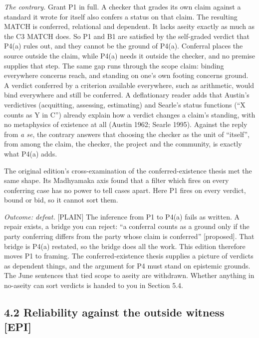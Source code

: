 \documentclass[11pt]{article}
\newcommand{\register}[1]{{\ttfamily\small #1}}
\begin{document}
\emph{The contrary.} Grant P1 in full. A checker that grades its own claim against a standard it wrote for itself also confers a status on that claim. The resulting MATCH is conferred, relational and dependent. It lacks aseity exactly as much as the C3 MATCH does. So P1 and B1 are satisfied by the self-graded verdict that P4(a) rules out, and they cannot be the ground of P4(a). Conferral places the source outside the claim, while P4(a) needs it outside the checker, and no premise supplies that step. The same gap runs through the scope claim: binding everywhere concerns reach, and standing on one's own footing concerns ground. A verdict conferred by a criterion available everywhere, such as arithmetic, would bind everywhere and still be conferred. A deflationary reader adds that Austin's verdictives (acquitting, assessing, estimating) and Searle's status functions (``X counts as Y in C'') already explain how a verdict changes a claim's standing, with no metaphysics of existence at all (Austin 1962; Searle 1995). Against the reply from \emph{a se}, the contrary answers that choosing the checker as the unit of ``itself'', from among the claim, the checker, the project and the community, is exactly what P4(a) adds.

The original edition's cross-examination of the conferred-existence thesis met the same shape. Its Madhyamaka axis found that a filter which fires on every conferring case has no power to tell cases apart. Here P1 fires on every verdict, bound or bid, so it cannot sort them.

\emph{Outcome: defeat.} \register{[PLAIN]} The inference from P1 to P4(a) fails as written. A repair exists, a bridge you can reject: ``a conferral counts as a ground only if the party conferring differs from the party whose claim is conferred'' [proposed]. That bridge is P4(a) restated, so the bridge does all the work. This edition therefore moves P1 to framing. The conferred-existence thesis supplies a picture of verdicts as dependent things, and the argument for P4 must stand on epistemic grounds. The June sentences that tied scope to aseity are withdrawn. Whether anything in no-aseity can sort verdicts is handed to you in Section 5.4.

\subsection*{4.2 Reliability against the outside witness [EPI]}
\end{document}
